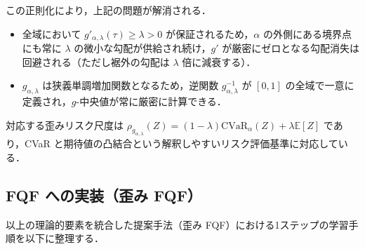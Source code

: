 \documentclass[a4paper,10pt]{jsarticle}
\theoremstyle{definition}
\newcommand{\CVaR}{\mathrm{CVaR}}
\newcommand{\E}{\mathbb{E}}
\begin{document}
この正則化により，上記の問題が解消される．
\begin{itemize}
  \item 全域において $g'_{\alpha,\lambda}(\tau) \ge \lambda > 0$ が保証されるため，$\alpha$ の外側にある境界点にも常に $\lambda$ の微小な勾配が供給され続け，$g'$ が厳密にゼロとなる勾配消失は回避される（ただし裾外の勾配は $\lambda$ 倍に減衰する）．
  \item $g_{\alpha,\lambda}$ は狭義単調増加関数となるため，逆関数 $g_{\alpha,\lambda}^{-1}$ が $[0, 1]$ の全域で一意に定義され，$g$-中央値が常に厳密に計算できる．
\end{itemize}
対応する歪みリスク尺度は $\rho_{g_{\alpha,\lambda}}(Z) = (1-\lambda)\CVaR_\alpha(Z) + \lambda\E[Z]$ であり，CVaR と期待値の凸結合という解釈しやすいリスク評価基準に対応している．

\subsection{FQF への実装（歪み FQF）}
\label{subsec:impl}

以上の理論的要素を統合した提案手法（歪み FQF）における1ステップの学習手順を以下に整理する．
\end{document}
